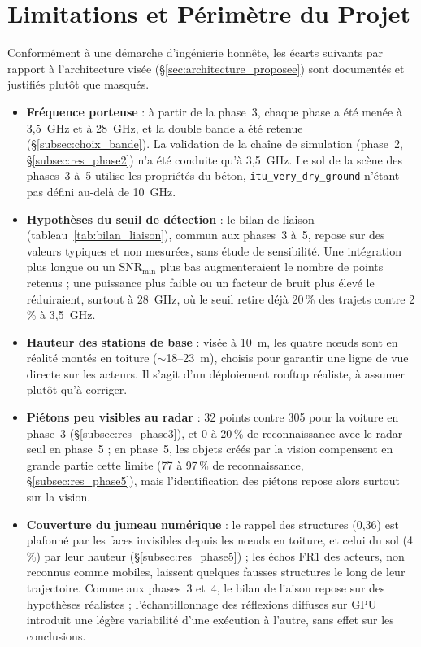 \documentclass[12pt,a4paper,titlepage]{article}
\begin{document}
\section{Limitations et Périmètre du Projet}
\label{sec:limitations}

Conformément à une démarche d'ingénierie honnête, les écarts suivants par rapport à l'architecture visée (\S\ref{sec:architecture_proposee}) sont documentés et justifiés plutôt que masqués.

\begin{itemize}[leftmargin=1.5em]
    \item \textbf{Fréquence porteuse} : à partir de la phase~3, chaque phase a été menée à 3,5~GHz et à 28~GHz, et la double bande a été retenue (\S\ref{subsec:choix_bande}). La validation de la chaîne de simulation (phase~2, \S\ref{subsec:res_phase2}) n'a été conduite qu'à 3,5~GHz. Le sol de la scène des phases~3 à~5 utilise les propriétés du béton, \texttt{itu\_very\_dry\_ground} n'étant pas défini au-delà de 10~GHz.
    \item \textbf{Hypothèses du seuil de détection} : le bilan de liaison (tableau~\ref{tab:bilan_liaison}), commun aux phases~3 à~5, repose sur des valeurs typiques et non mesurées, sans étude de sensibilité. Une intégration plus longue ou un $\mathrm{SNR}_{\min}$ plus bas augmenteraient le nombre de points retenus ; une puissance plus faible ou un facteur de bruit plus élevé le réduiraient, surtout à 28~GHz, où le seuil retire déjà 20\,\% des trajets contre 2\,\% à 3,5~GHz.
    \item \textbf{Hauteur des stations de base} : visée à 10~m, les quatre n\oe uds sont en réalité montés en toiture ($\sim$18--23~m), choisis pour garantir une ligne de vue directe sur les acteurs. Il s'agit d'un déploiement rooftop réaliste, à assumer plutôt qu'à corriger.
    \item \textbf{Piétons peu visibles au radar} : 32 points contre 305 pour la voiture en phase~3 (\S\ref{subsec:res_phase3}), et 0 à 20\,\% de reconnaissance avec le radar seul en phase~5 ; en phase~5, les objets créés par la vision compensent en grande partie cette limite (77 à 97\,\% de reconnaissance, \S\ref{subsec:res_phase5}), mais l'identification des piétons repose alors surtout sur la vision.
    \item \textbf{Couverture du jumeau numérique} : le rappel des structures (0,36) est plafonné par les faces invisibles depuis les n\oe uds en toiture, et celui du sol (4\,\%) par leur hauteur (\S\ref{subsec:res_phase5}) ; les échos FR1 des acteurs, non reconnus comme mobiles, laissent quelques fausses structures le long de leur trajectoire. Comme aux phases~3 et~4, le bilan de liaison repose sur des hypothèses réalistes ; l'échantillonnage des réflexions diffuses sur GPU introduit une légère variabilité d'une exécution à l'autre, sans effet sur les conclusions.

\end{itemize}
\end{document}
